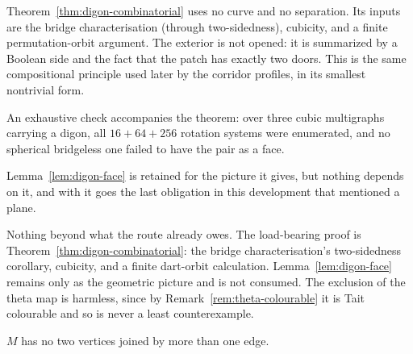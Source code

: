 \begin{remark}
\Sprose
Theorem~\ref{thm:digon-combinatorial} uses no curve and no separation. Its
inputs are the bridge characterisation (through two-sidedness), cubicity,
and a finite permutation-orbit argument. The exterior is not opened: it is
summarized by a Boolean side and the fact that the patch has exactly two
doors. This is the same compositional principle used later by the corridor
profiles, in its smallest nontrivial form.

An exhaustive check accompanies the theorem: over three cubic multigraphs
carrying a digon, all $16 + 64 + 256$ rotation systems were enumerated, and
no spherical bridgeless one failed to have the pair as a face.

Lemma~\ref{lem:digon-face} is retained for the picture it gives, but nothing
depends on it, and with it goes the last obligation in this development that
mentioned a plane.
\end{remark}

\begin{remark}
\Sprose
Nothing beyond what the route already owes.  The load-bearing proof is
Theorem~\ref{thm:digon-combinatorial}: the bridge characterisation's
two-sidedness corollary, cubicity, and a finite dart-orbit calculation.
Lemma~\ref{lem:digon-face} remains only as the
geometric picture and is not consumed.  The exclusion of the theta map is
harmless, since by Remark~\ref{rem:theta-colourable} it is Tait colourable and
so is never a least counterexample.
\end{remark}

\begin{lemma}\label{lem:no-parallel}
$M$ has no two vertices joined by more than one edge.
\end{lemma}

